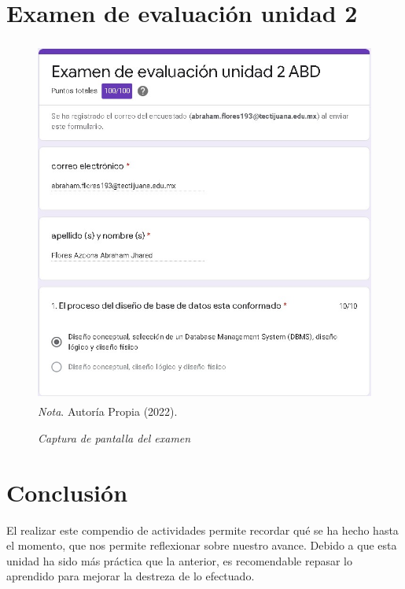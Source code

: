 \documentclass[stu, 12pt, letterpaper, donotrepeattitle, floatsintext, natbib]{apa7}
\begin{document}
\section{Examen de evaluación unidad 2}
\begin{figure}[H]
    \caption{\emph{Captura de pantalla del examen\\}}
    \centering
    \smallskip
    \includegraphics[width=17cm, height=12cm]{test.jpg}
    \bigskip
    \justifying\small\textit{Nota}. %
    Autoría Propia (2022).
\end{figure}

\section{Conclusión}
    \begin{justifying}
El realizar este compendio de actividades permite recordar qué se ha hecho hasta el momento, que nos permite reflexionar sobre nuestro avance.
Debido a que esta unidad ha sido más práctica que la anterior, es recomendable repasar lo aprendido para mejorar la destreza de lo efectuado.\par
    \end{justifying}
\end{document}
